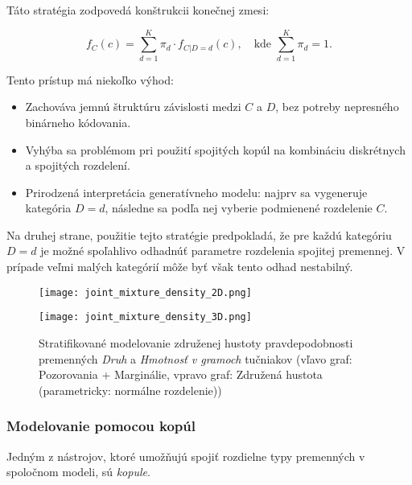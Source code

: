 Táto stratégia zodpovedá konštrukcii konečnej zmesi:

\begin{equation}
f_C(c) = \sum_{d=1}^{K} \pi_d \cdot f_{C|D=d}(c), \quad \text{kde } \sum_{d=1}^{K} \pi_d = 1.
\end{equation}

Tento prístup má niekoľko výhod:
\begin{itemize}
  \item Zachováva jemnú štruktúru závislosti medzi $C$ a $D$, bez potreby nepresného binárneho kódovania.
  \item Vyhýba sa problémom pri použití spojitých kopúl na kombináciu diskrétnych a spojitých rozdelení.
  \item Prirodzená interpretácia generatívneho modelu: najprv sa vygeneruje kategória $D = d$, následne sa podľa nej vyberie podmienené rozdelenie $C$.
\end{itemize}

Na druhej strane, použitie tejto stratégie predpokladá, že pre každú kategóriu $D = d$ je možné spoľahlivo odhadnúť parametre rozdelenia spojitej premennej. V prípade veľmi malých kategórií môže byť však tento odhad nestabilný.

\bigskip

\begin{figure}[H]
    \centering
    \begin{minipage}[t]{0.48\linewidth}
        \centering
        \texttt{[image: joint\_mixture\_density\_2D.png]}
    \end{minipage}
    \hfill
    \begin{minipage}[t]{0.48\linewidth}
        \centering
        \texttt{[image: joint\_mixture\_density\_3D.png]}
    \end{minipage}
    \caption{Stratifikované modelovanie združenej hustoty pravdepodobnosti premenných \textit{Druh} a \textit{Hmotnosť v gramoch} tučniakov (vľavo graf: Pozorovania + Marginálie, vpravo graf: Združená hustota (parametricky: normálne rozdelenie))}
    \label{fig:stratified_modelling_mix_density}
\end{figure}

\subsubsection{Modelovanie pomocou kopúl}\label{copula_joint_density}

Jedným z nástrojov, ktoré umožňujú spojiť rozdielne typy premenných v spoločnom modeli, sú \textit{kopule}.

